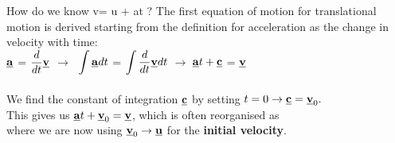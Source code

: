 \begin{frame}{How do we know v= u + at ?}
\small
The first equation of motion for translational motion is derived starting from the definition for acceleration as the change in velocity with time:\\[1ex]

\textcolor{blue}{$\displaystyle \underline{\mathbf{a}} $} = \textcolor{red}{$\displaystyle \frac{d}{dt}\underline{\mathbf{v}}$} $\rightarrow \;$  \textcolor{blue}{$\displaystyle \int \underline{\mathbf{a}} dt$} = \textcolor{red}{$ \displaystyle \int \frac{d}{dt}\underline{\mathbf{v}} dt$} $\rightarrow \; $\textcolor{blue}{$\underline{\mathbf{a}}t + \underline{\mathbf{c}}$} = \textcolor{red}{$ \underline{\mathbf{v}} $}\\[1ex]

\\[1ex]

We find the constant of integration $\underline{\mathbf{c}}$ by setting $t = 0 \rightarrow \underline{\mathbf{c}} = \underline{\mathbf{v}}_0 .$\\[2ex]

This gives us $\underline{\mathbf{a}}t + \underline{\mathbf{v}}_0 = \underline{\mathbf{v}}$, which is often reorganised as\\[1ex]
 where we are now using $\underline{\mathbf{v}}_0 \rightarrow \underline{\mathbf{u}}$ for the \textbf{initial velocity}.\\[1ex]




\\[1ex]
\vspace{1cm}

\end{frame}


